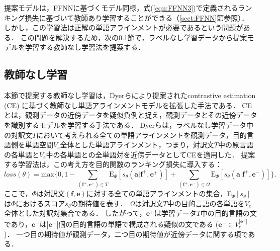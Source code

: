 \documentclass[japanese]{jnlp_1.4}
\begin{document}
提案モデルは，FFNNに基づくモデル同様，式(\ref{eqn:FFNN3})で定義されるランキング損失に基づいて教師あり学習することができる（\ref{sect:FFNN}節参照）．
しかし，この学習法は正解の単語アラインメントが必要であるという問題がある．
この問題を解決するため，次の\ref{sect:usv}節で，ラベルなし学習データから提案モデルを学習する教師なし学習法を提案する．


\subsection{教師なし学習}
\label{sect:usv}

本節で提案する教師なし学習は，Dyerらにより提案されたcontrastive estimation (CE) \cite{smith05}に基づく教師なし単語アラインメントモデル\cite{dyer11}を拡張した手法である．
CEとは，観測データの近傍データを疑似負例と捉え，観測データとその近傍データを識別するモデルを学習する手法である．
Dyerらは，ラベルなし学習データ中の対訳文$T$において考えられる全ての単語アラインメントを観測データ，目的言語側を単語空間$V_{e}$全体とした単語アラインメント，つまり，対訳文$T$中の原言語の各単語と$V_{e}$中の各単語との全単語対を近傍データとしてCEを適用した．
提案する学習法は，この考え方を目的関数のランキング損失に導入する：
\begin{equation}
\label{eqn:usv1}
\mathit{loss}(\theta)=\text{max} \biggl\{0,1-\sum_{\boldsymbol{(f^{+},e^{+})} \in T}\text{E}_{\Phi}[s_{\theta}(\boldsymbol{a}|\boldsymbol{f^{+}},\boldsymbol{e^{+}})]+\sum_{(\boldsymbol{f^{+}},\boldsymbol{e^{-}}) \in \Omega} \text{E}_{\Phi}[s_{\theta}(\boldsymbol{a}|\boldsymbol{f^{+}},\boldsymbol{e^{-}})]\biggr\}.
\end{equation}
ここで，$\Phi$は対訳文$(\boldsymbol{f},\boldsymbol{e})$に対する全ての単語アラインメントの集合，E$_{\Phi}[s_{\theta}]$は$\Phi$におけるスコア$s_{\theta}$の期待値を表す．
$\Omega$は対訳文$T$中の目的言語の各単語を$V_{e}$全体とした対訳対集合である．
したがって，$\boldsymbol{e^{+}}$は学習データ$T$中の目的言語の文であり，$\boldsymbol{e^{-}}$は$|\boldsymbol{e^{+}}|$個の目的言語の単語で構成される疑似の文である ($\boldsymbol{e^{-}} \in V_{e}^{|\boldsymbol{e^{+}}|}$)．
一つ目の期待値が観測データ，二つ目の期待値が近傍データに関する項である．
\end{document}

